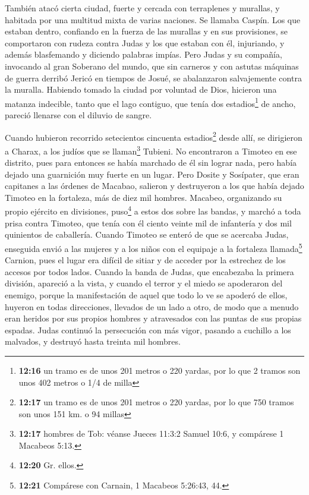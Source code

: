  También atacó cierta ciudad, fuerte y cercada con
terraplenes y murallas, y habitada por una multitud mixta de varias
naciones. Se llamaba Caspín.  Los que estaban dentro,
confiando en la fuerza de las murallas y en sus provisiones, se
comportaron con rudeza contra Judas y los que estaban con él,
injuriando, y además blasfemando y diciendo palabras impías.
 Pero Judas y su compañía, invocando al gran Soberano del
mundo, que sin carneros y con astutas máquinas de guerra derribó Jericó
en tiempos de Josué, se abalanzaron salvajemente contra la muralla.
 Habiendo tomado la ciudad por voluntad de Dios, hicieron
una matanza indecible, tanto que el lago contiguo, que tenía dos
estadios\footnote{\textbf{12:16} un tramo es de unos 201 metros o 220
  yardas, por lo que 2 tramos son unos 402 metros o 1/4 de milla} de
ancho, pareció llenarse con el diluvio de sangre.

 Cuando hubieron recorrido setecientos cincuenta
estadios\footnote{\textbf{12:17} un tramo es de unos 201 metros o 220
  yardas, por lo que 750 tramos son unos 151 km. o 94 millas} desde
allí, se dirigieron a Charax, a los judíos que se llaman\footnote{\textbf{12:17}
  hombres de Tob: véanse Jueces 11:3:2 Samuel 10:6, y compárese 1
  Macabeos 5:13.} Tubieni.  No encontraron a Timoteo en
ese distrito, pues para entonces se había marchado de él sin lograr
nada, pero había dejado una guarnición muy fuerte en un lugar.
 Pero Dosite y Sosípater, que eran capitanes a las
órdenes de Macabao, salieron y destruyeron a los que había dejado
Timoteo en la fortaleza, más de diez mil hombres. 
Macabeo, organizando su propio ejército en divisiones, puso\footnote{\textbf{12:20}
  Gr. ellos.} a estos dos sobre las bandas, y marchó a toda prisa contra
Timoteo, que tenía con él ciento veinte mil de infantería y dos mil
quinientos de caballería.  Cuando Timoteo se enteró de
que se acercaba Judas, enseguida envió a las mujeres y a los niños con
el equipaje a la fortaleza llamada\footnote{\textbf{12:21} Compárese con
  Carnain, 1 Macabeos 5:26:43, 44.} Carnion, pues el lugar era difícil
de sitiar y de acceder por la estrechez de los accesos por todos lados.
 Cuando la banda de Judas, que encabezaba la primera
división, apareció a la vista, y cuando el terror y el miedo se
apoderaron del enemigo, porque la manifestación de aquel que todo lo ve
se apoderó de ellos, huyeron en todas direcciones, llevados de un lado a
otro, de modo que a menudo eran heridos por sus propios hombres y
atravesados con las puntas de sus propias espadas.  Judas
continuó la persecución con más vigor, pasando a cuchillo a los
malvados, y destruyó hasta treinta mil hombres.

